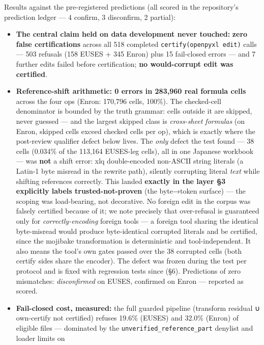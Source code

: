 \documentclass[
  11pt,
]{article}
\providecommand{\tightlist}{%
  \setlength{\itemsep}{0pt}\setlength{\parskip}{0pt}}
\begin{document}
Results against the pre-registered predictions (all scored in the
repository's prediction ledger --- 4 confirm, 3 disconfirm, 2 partial):

\begin{itemize}
\tightlist
\item
  \textbf{The central claim held on data development never touched:}
  \textbf{zero false certifications} across all 518 completed
  \texttt{certify(openpyxl\ edit)} calls --- 503 refusals (158 EUSES +
  345 Enron) plus 15 fail-closed errors --- and 7 further edits failed
  before certification; \textbf{no would-corrupt edit was certified}.
\item
  \textbf{Reference-shift arithmetic: 0 errors in 283,960 real formula
  cells} across the four ops (Enron: 170,796 cells, 100\%). The
  checked-cell denominator is bounded by the truth grammar: cells
  outside it are skipped, never guessed --- and the largest skipped
  class is \emph{cross-sheet formulas} (on Enron, skipped cells exceed
  checked cells per op), which is exactly where the post-review
  qualifier defect below lives. The \emph{only} defect the test found
  --- 38 cells (0.034\% of the 113,164 EUSES-leg cells), all in one
  Japanese workbook --- was \textbf{not} a shift error: xlq
  double-encoded non-ASCII string literals (a Latin-1 byte misread in
  the rewrite path), silently corrupting literal \emph{text} while
  shifting references correctly. This landed \textbf{exactly in the
  layer §3 explicitly labels trusted-not-proven} (the byte→token
  surface) --- the scoping was load-bearing, not decorative. No foreign
  edit in the corpus was falsely certified because of it; we note
  precisely that over-refusal is guaranteed only for
  \emph{correctly-encoding} foreign tools --- a foreign tool sharing the
  identical byte-misread would produce byte-identical corrupted literals
  and be certified, since the mojibake transformation is deterministic
  and tool-independent. It also means the tool's own gates passed over
  the 38 corrupted cells (both certify sides share the encoder). The
  defect was frozen during the test per protocol and is fixed with
  regression tests since (§6). Predictions of zero mismatches:
  \emph{disconfirmed} on EUSES, confirmed on Enron --- reported as
  scored.
\item
  \textbf{Fail-closed cost, measured:} the full guarded pipeline
  (transform residual ∪ own-certify not certified) refuses 19.6\%
  (EUSES) and 32.0\% (Enron) of eligible files --- dominated by the
  \texttt{unverified\_reference\_part} denylist and loader limits on

\end{itemize}
\end{document}
